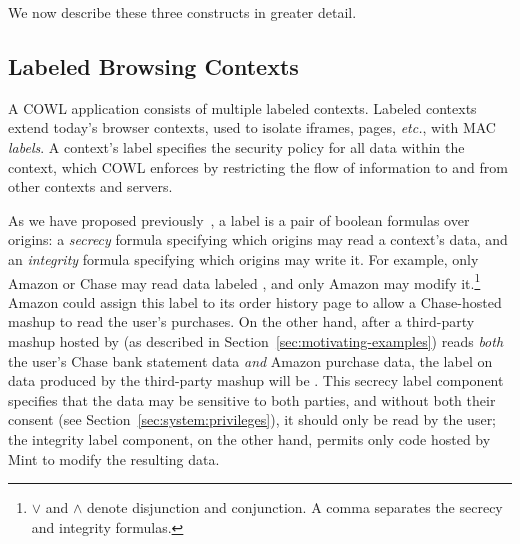 We now describe these three constructs in greater detail.



\subsection{Labeled Browsing Contexts}
\label{sec:system:contexts}
A COWL application consists of multiple labeled contexts.
%
Labeled contexts extend today's browser contexts, used to isolate
iframes, pages, \emph{etc.}, with MAC \emph{labels}.
%
A context's label specifies the security policy for all data within
the context, which COWL enforces by restricting the flow of
information to and from other contexts and servers.

As we have proposed previously~\cite{yang:2013:towards,
  stefan:2011:dclabels}, a label is a pair of boolean formulas over
  origins: a
\emph{secrecy} formula specifying which origins may read a context's
data, and an \emph{integrity} formula specifying which origins may
write it.
%
For example, only Amazon or Chase may read data labeled
, and only Amazon may modify
it.\footnote{$\lor$ and $\land$ denote disjunction and conjunction. A
  comma separates the secrecy and integrity formulas.}
%
Amazon could assign this label to its order history page to allow a
Chase-hosted mashup to read the user's purchases.
%
On the other hand, after a third-party mashup hosted by
 (as described in
Section~\ref{sec:motivating-examples}) reads {\em both} the user's
Chase bank statement data {\em and} Amazon purchase data, the label on
data produced by the third-party mashup will be
.
%
This secrecy label component specifies that the data may be sensitive
to both parties, and without both their consent (see
Section~\ref{sec:system:privileges}), it should only be read by the user;
the integrity label component, on the other hand, permits only code
hosted by Mint to modify the resulting data.
 
